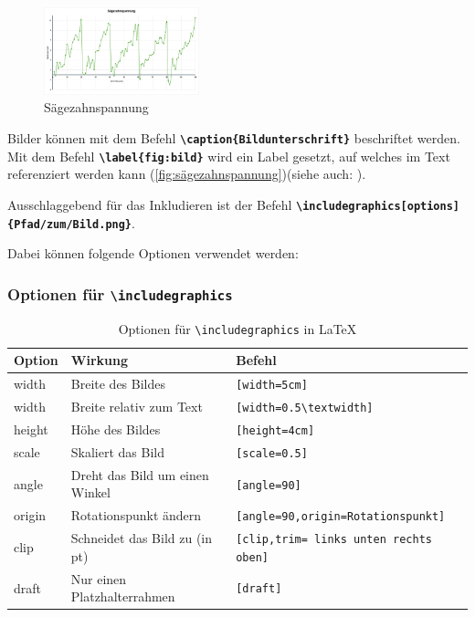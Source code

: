 \begin{figure}[H]
    \centering
    \includegraphics[width=0.4\textwidth]{anlagen/bilder/Graph.png}
    \caption{Sägezahnspannung}
    \label{fig:sägezahnspannung}
\end{figure}

Bilder können mit dem Befehl \textbf{\texttt{\textbackslash caption\{Bildunterschrift\}}} beschriftet werden. Mit dem Befehl \textbf{\texttt{\textbackslash label\{fig:bild\}}} wird ein Label gesetzt, auf welches im Text referenziert werden kann (\autoref{fig:sägezahnspannung})(siehe auch: ).

Ausschlaggebend für das Inkludieren ist der Befehl \textbf{\texttt{\textbackslash includegraphics[options]\{Pfad/zum/Bild.png\}}}.

Dabei können folgende Optionen verwendet werden:

\subsubsection{Optionen für \texttt{\textbackslash includegraphics}}
\begin{table}[H]
    \centering
    \begin{tabular}{lll}
        \toprule
        \textbf{Option} & \textbf{Wirkung}               & \textbf{Befehl}                               \\
        \midrule
        width           & Breite des Bildes              & \texttt{[width=5cm]}                          \\
        width           & Breite relativ zum Text        & \texttt{[width=0.5\textbackslash textwidth]}  \\
        height          & Höhe des Bildes                & \texttt{[height=4cm]}                         \\
        scale           & Skaliert das Bild              & \texttt{[scale=0.5]}                          \\
        angle           & Dreht das Bild um einen Winkel & \texttt{[angle=90]}                           \\
        origin          & Rotationspunkt ändern          & \texttt{[angle=90,origin=Rotationspunkt]}     \\
        clip            & Schneidet das Bild zu (in pt)  & \texttt{[clip,trim= links unten rechts oben]} \\
        draft           & Nur einen Platzhalterrahmen    & \texttt{[draft]}                              \\
        \bottomrule
    \end{tabular}
    \caption{Optionen für \texttt{\textbackslash includegraphics} in LaTeX}
    \label{tab:graphics_options}
\end{table}

